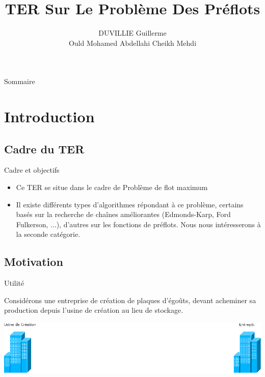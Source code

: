 \documentclass[hyperref={},
xcolor={dvipsnames,svgnames,table},10pt]{beamer}
\title{TER Sur Le Problème Des Préflots}
\author{DUVILLIE Guillerme \\ Ould Mohamed Abdellahi Cheikh Mehdi}
\institute{Université Montpellier2\\ Master1-Informatique\\ Spécialité-MOCA}
\begin{document}
\begin{frame}
	\titlepage 
\end{frame}



\begin{frame}{Sommaire}
  \tableofcontents
\end{frame} 

\section{Introduction}
\subsection{Cadre du TER}
\begin{frame}{Cadre et objectifs}
	\begin{itemize}
		\item Ce TER se situe dans le cadre de Problème de flot maximum

		\item Il existe différents types d'algorithmes répondant à ce problème, certains basés sur la recherche
			de chaînes améliorantes (Edmonds-Karp, Ford Fulkerson, ...), d'autres sur les fonctions de préflots. 
			Nous nous intéresserons à la seconde catégorie.
	\end{itemize}
\end{frame}

\subsection{Motivation}
\begin{frame}{Utilité}
	
	Considérons une entreprise de création de plaques d'égoûts, devant acheminer sa production depuis
	l'usine de création au lieu de stockage. \vfill

	\begin{center}
		\includegraphics[scale=0.32]{img/etape1.png}
	\end{center}
\end{frame}
\end{document}
